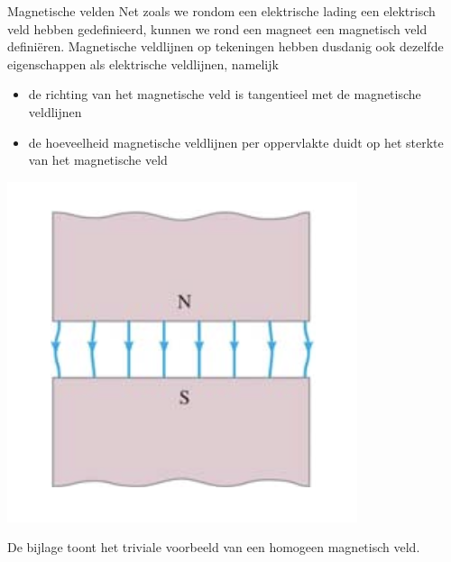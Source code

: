 \begin{theo}{Magnetische velden}
    Net zoals we rondom een elektrische lading een elektrisch veld hebben gedefinieerd, kunnen we rond een magneet een magnetisch veld
    definiëren. Magnetische veldlijnen op tekeningen hebben dusdanig ook dezelfde eigenschappen als elektrische veldlijnen, namelijk

    \begin{minipage}{.7\textwidth}
        \begin{itemize}
            \item de richting van het magnetische veld is tangentieel met de magnetische veldlijnen
            \item de hoeveelheid magnetische veldlijnen per oppervlakte duidt op het sterkte van het magnetische veld
        \end{itemize}

    \end{minipage}
    \begin{minipage}{.24\textwidth}
        \includegraphics[scale = 0.5]{Images/Magnetisme/HomogeenMagnetischVeld}
    \end{minipage}

    \noindent De bijlage toont het triviale voorbeeld van een homogeen magnetisch veld.
\end{theo}

